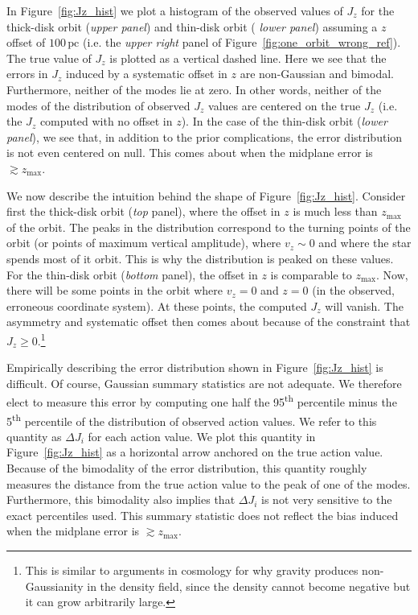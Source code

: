 \documentclass[twocolumn]{aastex62}
\newcommand{\pc}{\text{pc}}
\newcommand{\uth}{\textsuperscript{th}}
\begin{document}
In Figure~\ref{fig:Jz_hist} we plot a histogram of the observed values of
$J_z$ for the thick-disk orbit ({\em upper panel}) and thin-disk orbit ({\em
lower panel}) assuming a $z$ offset of $100\,\pc$ (i.e. the {\em upper right} panel
of Figure~\ref{fig:one_orbit_wrong_ref}). The true value of $J_z$ is plotted
as a vertical dashed line. Here we see that the errors in $J_z$ induced by a
systematic offset in $z$ are non-Gaussian and bimodal. Furthermore, neither of
the modes lie at zero. In other words, neither of the modes of the
distribution of observed $J_z$ values are centered on the true $J_z$ (i.e. the
$J_z$ computed with no offset in $z$). In the case of the thin-disk orbit
({\em lower panel}), we see that, in addition to the prior complications, the
error distribution is not even centered on null. This comes about when the
midplane error is $\gtrsim z_{\text{max}}$.

We now describe the intuition behind the shape of Figure~\ref{fig:Jz_hist}.
Consider first the thick-disk orbit ({\em top} panel), where the
offset in $z$ is much less than $z_{\text{max}}$ of the orbit. The peaks in
the distribution correspond to the turning points of the orbit (or points of
maximum vertical amplitude), where $v_z \sim 0$ and where the star spends
most of it orbit. This is why the distribution is peaked on these values. For
the thin-disk orbit ({\em bottom} panel), the offset in $z$ is comparable to
$z_{\text{max}}$. Now, there will be some points in the orbit where $v_z = 0$
and $z=0$ (in the observed, erroneous coordinate system). At these points, the
computed $J_z$ will vanish. The asymmetry and systematic offset then comes
about because of the constraint that $J_z \geq 0$.\footnote{This is similar to
arguments in cosmology for why gravity produces non-Gaussianity in the density
field, since the density cannot become negative but it can grow arbitrarily
large.}

Empirically describing the error distribution shown in
Figure~\ref{fig:Jz_hist} is difficult. Of course, Gaussian summary statistics
are not adequate. We therefore elect to measure this error by computing one
half the 95\uth{} percentile minus the 5\uth{} percentile of the distribution
of observed action values. We refer to this quantity as $\Delta J_i$ for each
action value. We plot this quantity in Figure~\ref{fig:Jz_hist} as a
horizontal arrow anchored on the true action value. Because of the bimodality
of the error distribution, this quantity roughly measures the distance from
the true action value to the peak of one of the modes. Furthermore, this
bimodality also implies that $\Delta J_i$ is not very sensitive to the exact
percentiles used. This summary statistic does not reflect the bias induced
when the midplane error is $\gtrsim z_{\text{max}}$.
\end{document}
